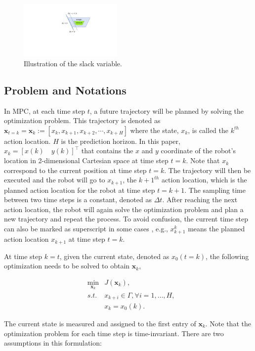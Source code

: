 \documentclass[letterpaper, 10 pt, conference]{ieeeconf}  %
\begin{document}
\begin{figure}[t]
      \centering
      \includegraphics[width=5cm]{plot/slack.pdf}
      \caption{Illustration of the slack variable. }
      \label{fig:slack}
\end{figure}

\subsection{Problem and Notations}
In MPC, at each time step $t$, a future trajectory will be planned by solving the optimization problem. This trajectory is denoted as $\mathbf{x}_{t=k}=\mathbf{x}_{k} := [x_k, x_{k+1},x_{k+2},\cdots,x_{k+H}]$ where the state, $x_k$, is called the $k^{th}$ action location. $H$ is the prediction horizon. In this paper, $x_k= [x(k)\quad y(k)]^{\intercal}$ that contains the $x$ and $y$ coordinate of the robot's location in 2-dimensional Cartesian space at time step $t=k$. Note that $x_k$ correspond to the current position at time step $t=k$. The trajectory will then be executed and the robot will go to $x_{k+1}$, the $k+1^{th}$ action location, which is the planned action location for the robot at time step $t=k+1$. The sampling time between two time steps is a constant, denoted as $\Delta t$. After reaching the next action location, the robot will again solve the optimization problem and plan a new trajectory and repeat the process. To avoid confusion, the current time step can also be marked as superscript in some cases , e.g., $x_{k+1}^k$ means the planned action location $x_{k+1}$ at time step $t=k$.

At time step $k=t$, given the current state, denoted as $x_0(t=k)$, the following optimization needs to be solved to obtain $\mathbf{x}_k$,


\begin{eqnarray}
&\min_{\mathbf{x}_{k}} & J(\mathbf{x}_k),\\
&s.t.& x_{k+i}\in\Gamma,\forall i=1,\ldots,H,\\
&&         x_{k}=x_0(k).
\end{eqnarray}

The current state is measured and assigned to the first entry of $\mathbf{x}_{k}$. Note that the optimization problem for each time step is time-invariant. There are two assumptions in this formulation: 
\end{document}
